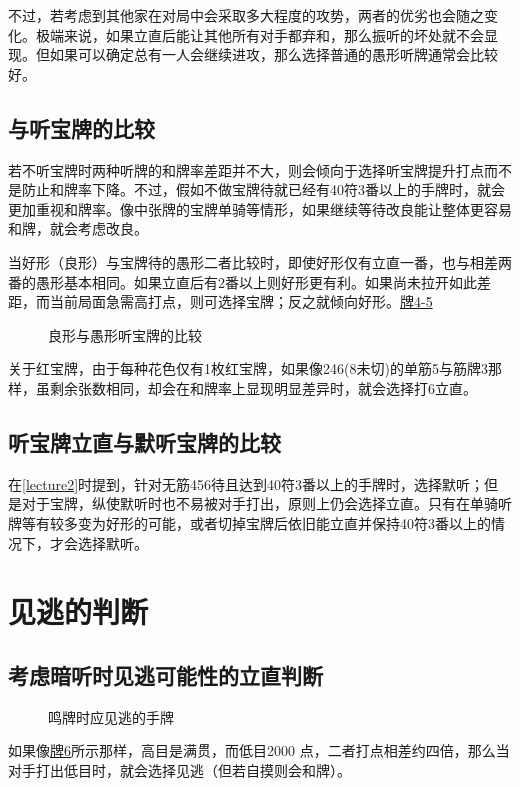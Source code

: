 不过，若考虑到其他家在对局中会采取多大程度的攻势，两者的优劣也会随之变化。极端来说，如果立直后能让其他所有对手都弃和，那么振听的坏处就不会显现。但如果可以确定总有一人会继续进攻，那么选择普通的愚形听牌通常会比较好。

\subsection{与听宝牌的比较}
若不听宝牌时两种听牌的和牌率差距并不大，则会倾向于选择听宝牌提升打点而不是防止和牌率下降。不过，假如不做宝牌待就已经有40符3番以上的手牌时，就会更加重视和牌率。像中张牌的宝牌单骑等情形，如果继续等待改良能让整体更容易和牌，就会考虑改良。

当好形（良形）与宝牌待的愚形二者比较时，即使好形仅有立直一番，也与相差两番的愚形基本相同。如果立直后有2番以上则好形更有利。如果尚未拉开如此差距，而当前局面急需高打点，则可选择宝牌；反之就倾向好形。\hyperref[lec4:pai4-5]{牌4-5}

\begin{figure}[h]
    \caption{良形与愚形听宝牌的比较}\label{lec4:pai4-5}
    \par\bigskip
\end{figure}

关于红宝牌，由于每种花色仅有1枚红宝牌，如果像246(8未切)的单筋5与筋牌3那样，虽剩余张数相同，却会在和牌率上显现明显差异时，就会选择打6立直。

\subsection{听宝牌立直与默听宝牌的比较}
在\ref{lecture2}时提到，针对无筋456待且达到40符3番以上的手牌时，选择默听；但是对于宝牌，纵使默听时也不易被对手打出，原则上仍会选择立直。只有在单骑听牌等有较多变为好形的可能，或者切掉宝牌后依旧能立直并保持40符3番以上的情况下，才会选择默听。

\section{见逃的判断}
\subsection{考虑暗听时见逃可能性的立直判断}
\begin{figure}[h]
    \caption{鸣牌时应见逃的手牌}\label{lec4:pai6}
\end{figure}
如果像\hyperref[lec4:pai6]{牌6}所示那样，高目是满贯，而低目2000 点，二者打点相差约四倍，那么当对手打出低目时，就会选择见逃（但若自摸则会和牌）。

